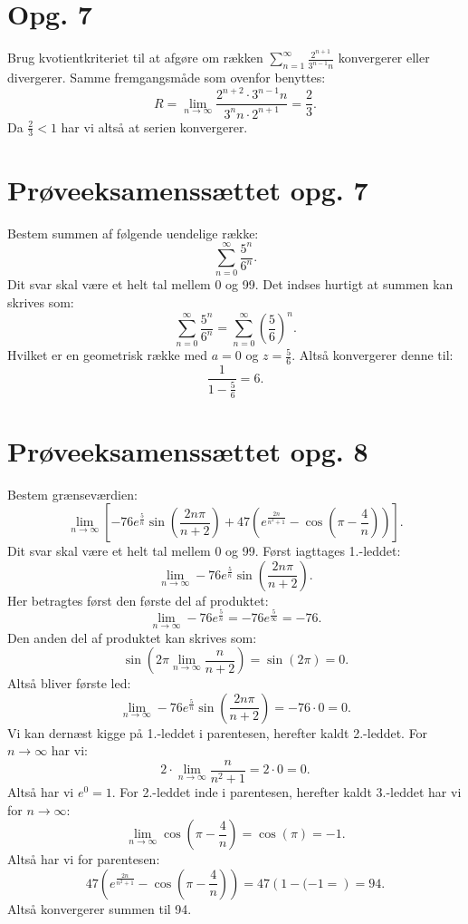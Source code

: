 \documentclass[12pt]{article}
\begin{document}
\section*{Opg. 7}
Brug kvotientkriteriet til at afgøre om rækken $\sum_{n=1}^{\infty} \frac{2^{n+1}}{3^{n-1}n}$ konvergerer eller divergerer.
\bigbreak
Samme fremgangsmåde som ovenfor benyttes:
\[
R = \lim_{n \to \infty} \frac{2^{n+2}\cdot 3^{n-1}n}{3^n n \cdot 2^{n+1}} = \frac{2}{3} 
.\] 
Da $\frac{2}{3}<1$ har vi altså at serien konvergerer.

\section*{Prøveeksamenssættet opg. 7}
Bestem summen af følgende uendelige række:
\[
\sum_{n=0}^{\infty} \frac{5^n}{6^n}
.\] 
Dit svar skal være et helt tal mellem 0 og 99.
\bigbreak
Det indses hurtigt at summen kan skrives som:
\[
\sum_{n=0}^{\infty} \frac{5^n}{6^n} = \sum_{n=0}^{\infty} \left( \frac{5}{6} \right)^n
.\] 
Hvilket er en geometrisk række med $a=0$ og  $z=\frac{5}{6}$. Altså konvergerer denne til:
\[
\frac{1}{1-\frac{5}{6}} = 6
.\] 

\section*{Prøveeksamenssættet opg. 8}
Bestem grænseværdien:
\[
  \lim_{n \to \infty} \left[ -76e^{\frac{5}{n}} \sin\left( \frac{2n\pi}{n+2} \right) + 47\left( e^{\frac{2n}{n^2+1}}-\cos\left( \pi-\frac{4}{n} \right)  \right)  \right]  
.\] 
Dit svar skal være et helt tal mellem 0 og 99.
\bigbreak
Først iagttages 1.-leddet:
\[
\lim_{n \to \infty} -76e^{\frac{5}{n}}\sin\left( \frac{2n\pi}{n+2} \right) 
.\]
Her betragtes først den første del af produktet:
\[
  \lim_{n \to \infty} -76e^{\frac{5}{n}} = -76e^{\frac{5}{\infty}} = -76
.\] 
Den anden del af produktet kan skrives som:
\[
\sin\left( 2\pi \lim_{n \to \infty} \frac{n}{n+2} \right) = \sin(2\pi) = 0
.\] 
Altså bliver første led:
\[
\lim_{n \to \infty} -76e^{\frac{5}{n}}\sin\left( \frac{2n\pi}{n+2} \right) = -76\cdot 0 = 0 
.\]
Vi kan dernæst kigge på 1.-leddet i parentesen, herefter kaldt 2.-leddet. For $n \to \infty$ har vi:
\[
2\cdot \lim_{n \to \infty} \frac{n}{n^2+1} = 2\cdot 0 = 0
.\] 
Altså har vi $e^0 = 1$. For 2.-leddet inde i parentesen, herefter kaldt 3.-leddet har vi for  $n \to \infty$:
\[
\lim_{n \to \infty} \cos \left( \pi-\frac{4}{n} \right) = \cos(\pi) = -1
.\] 
Altså har vi for parentesen:
\[
47\left( e^{\frac{2n}{n^2+1}}-\cos\left( \pi-\frac{4}{n} \right)  \right) = 47\left( 1 - (-1= \right)  = 94
.\] 
Altså konvergerer summen til 94.
\end{document}

